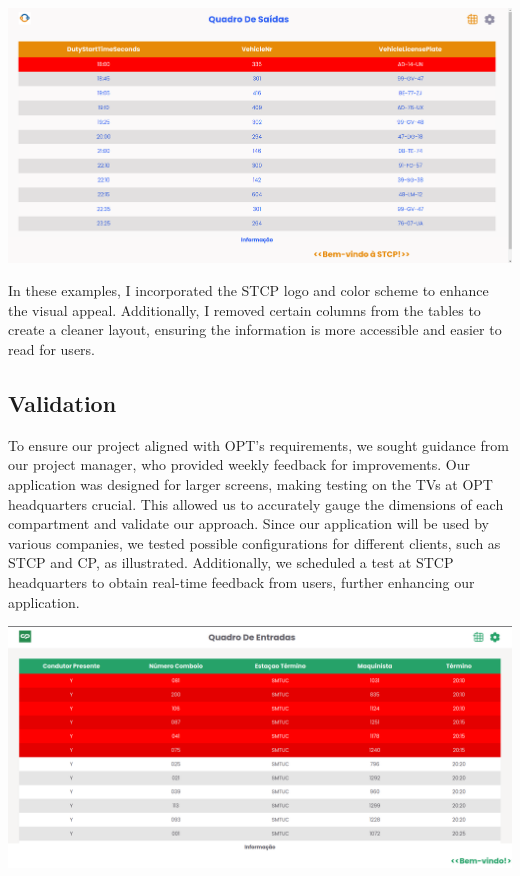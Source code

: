 \documentclass[10pt]{article}
\begin{document}
            \vfill
        \includegraphics[width=1\textwidth]{table_of_exits_stcp2}
            \vfill

        In these examples, I incorporated the STCP logo and color scheme to enhance the visual appeal. 
        Additionally, I removed certain columns from the tables to create a cleaner layout, ensuring the information is more accessible and easier to read for users.

        
        \subsection{Validation}

        To ensure our project aligned with OPT's requirements, we sought guidance from our project manager, who provided weekly feedback for improvements. Our application was designed for larger screens, making testing on the TVs at OPT headquarters crucial. This allowed us to accurately gauge the dimensions of each compartment and validate our approach. Since our application will be used by various companies, we tested possible configurations for different clients, such as STCP and CP, as illustrated. Additionally, we scheduled a test at STCP headquarters to obtain real-time feedback from users, further enhancing our application.

            \vfill
        \includegraphics[width=1\textwidth]{validation_eg}
            \vfill
\end{document}
